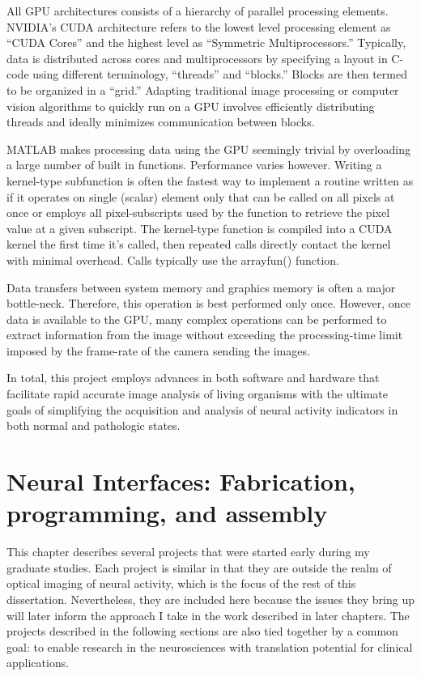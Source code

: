 \documentclass[
  12pt,
]{report}
\numberwithin{figure}{section}
\numberwithin{table}{section}
\numberwithin{equations}{section}
\begin{document}
All GPU architectures consists of a hierarchy of parallel processing
elements. NVIDIA's CUDA architecture refers to the lowest level
processing element as ``CUDA Cores'' and the highest level as
``Symmetric Multiprocessors.'' Typically, data is distributed across
cores and multiprocessors by specifying a layout in C-code using
different terminology, ``threads'' and ``blocks.'' Blocks are then
termed to be organized in a ``grid.'' Adapting traditional image
processing or computer vision algorithms to quickly run on a GPU
involves efficiently distributing threads and ideally minimizes
communication between blocks.

MATLAB makes processing data using the GPU seemingly trivial by
overloading a large number of built in functions. Performance varies
however. Writing a kernel-type subfunction is often the fastest way to
implement a routine written as if it operates on single (scalar) element
only that can be called on all pixels at once or employs all
pixel-subscripts used by the function to retrieve the pixel value at a
given subscript. The kernel-type function is compiled into a CUDA kernel
the first time it's called, then repeated calls directly contact the
kernel with minimal overhead. Calls typically use the arrayfun()
function.

Data transfers between system memory and graphics memory is often a
major bottle-neck. Therefore, this operation is best performed only
once. However, once data is available to the GPU, many complex
operations can be performed to extract information from the image
without exceeding the processing-time limit imposed by the frame-rate of
the camera sending the images.

In total, this project employs advances in both software and hardware
that facilitate rapid accurate image analysis of living organisms with
the ultimate goals of simplifying the acquisition and analysis of neural
activity indicators in both normal and pathologic states.

\hypertarget{neural-interfaces-fabrication-programming-and-assembly}{%
\chapter{Neural Interfaces: Fabrication, programming, and
assembly}\label{neural-interfaces-fabrication-programming-and-assembly}}

This chapter describes several projects that were started early during
my graduate studies. Each project is similar in that they are outside
the realm of optical imaging of neural activity, which is the focus of
the rest of this dissertation. Nevertheless, they are included here
because the issues they bring up will later inform the approach I take
in the work described in later chapters. The projects described in the
following sections are also tied together by a common goal: to enable
research in the neurosciences with translation potential for clinical
applications.
\end{document}
